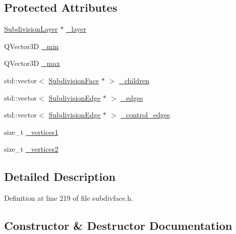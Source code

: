 \subsection*{Protected Attributes}
\begin{DoxyCompactItemize}
\item 
\hyperlink{classShipCAD_1_1SubdivisionLayer}{Subdivision\+Layer} $\ast$ \hyperlink{classShipCAD_1_1SubdivisionControlFace_aee1990d4db7127ba59117a65c1a6ce7e}{\+\_\+layer}
\item 
Q\+Vector3D \hyperlink{classShipCAD_1_1SubdivisionControlFace_aac4f577da0f5203059901c5e09814e1d}{\+\_\+min}
\item 
Q\+Vector3D \hyperlink{classShipCAD_1_1SubdivisionControlFace_a22411574593283209772872bc740535b}{\+\_\+max}
\item 
std\+::vector$<$ \hyperlink{classShipCAD_1_1SubdivisionFace}{Subdivision\+Face} $\ast$ $>$ \hyperlink{classShipCAD_1_1SubdivisionControlFace_a116749a1de58ad46f68ad7e92031e673}{\+\_\+children}
\item 
std\+::vector$<$ \hyperlink{classShipCAD_1_1SubdivisionEdge}{Subdivision\+Edge} $\ast$ $>$ \hyperlink{classShipCAD_1_1SubdivisionControlFace_a390f626d9999ab3ce48878b223ea1693}{\+\_\+edges}
\item 
std\+::vector$<$ \hyperlink{classShipCAD_1_1SubdivisionEdge}{Subdivision\+Edge} $\ast$ $>$ \hyperlink{classShipCAD_1_1SubdivisionControlFace_a33d7e2ecd5f42edf5492efb83df3856b}{\+\_\+control\+\_\+edges}
\item 
size\+\_\+t \hyperlink{classShipCAD_1_1SubdivisionControlFace_a5383fb638609da875d97457db86cd4df}{\+\_\+vertices1}
\item 
size\+\_\+t \hyperlink{classShipCAD_1_1SubdivisionControlFace_a1fbe1fd20344cf8dc19bf3489f774205}{\+\_\+vertices2}
\end{DoxyCompactItemize}


\subsection{Detailed Description}


Definition at line 219 of file subdivface.\+h.



\subsection{Constructor \& Destructor Documentation}
